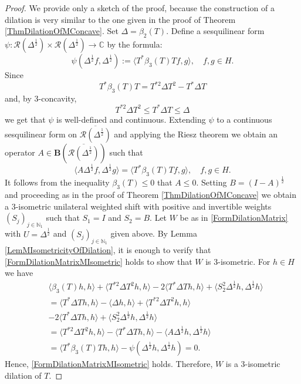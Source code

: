 \documentclass{amsart}
\renewcommand{\le}{\leqslant}
\theoremstyle{definition}
\numberwithin{equation}{section}
\begin{document}
\begin{proof}
    We provide only a sketch of the proof, because the construction of a dilation is very similar to the one given in the proof of Theorem \ref{ThmDilationOfMConcave}. Set $ \Delta = \beta_{2}(T) $. Define a sesquilinear form $ \psi\colon \mathcal{R}(\Delta^{\frac{1}{2}})\times \mathcal{R}(\Delta^{\frac{1}{2}}) \to \mathbb{C} $ by the formula:
    \begin{equation*}
        \psi(\Delta^{\frac{1}{2}}f,\Delta^{\frac{1}{2}}):= \langle T^{\ast}\beta_{3}(T)Tf,g\rangle, \quad f,g\in H.
    \end{equation*}
    Since
    \begin{equation*}
        T^{\ast}\beta_{3}(T)T = T^{\ast 2}\Delta T^{2} - T^{\ast}\Delta T
    \end{equation*}
    and, by 3-concavity,
    \begin{equation*}
        T^{\ast 2}\Delta T^{2} \le T^{\ast }\Delta T \le \Delta
    \end{equation*}
    we get that $ \psi $ is well-defined and continuous.  Extending $ \psi $ to a continuous sesquilinear form on $ \overline{\mathcal{R}(\Delta^{\frac{1}{2}})} $ and applying the Riesz theorem we obtain an operator $ A\in \mathbf{B}(\overline{\mathcal{R}(\Delta^{\frac{1}{2}})}) $ such that
    \begin{equation}
        \langle A\Delta^{\frac{1}{2}}f,\Delta^{\frac{1}{2}}g\rangle = \langle T^{\ast}\beta_{3}(T)Tf,g\rangle, \quad f,g\in H.
    \end{equation}
    It follows from the inequality $ \beta_{3}(T)\le 0 $ that $ A\le 0 $. Setting $ B = (I-A)^{\frac{1}{2}} $ and proceeding as in the proof of Theorem \ref{ThmDilationOfMConcave} we obtain a 3-isometric unilateral weighted shift with positive and invertible weights $ (S_{j})_{j\in \mathbb{N}_{1}} $ such that $ S_{1} = I $ and $ S_{2} = B $. Let $ W $ be as in \eqref{FormDilationMatrix} with $ U = \Delta^{\frac{1}{2}} $ and $ (S_{j})_{j\in \mathbb{N}_{1}} $ given above. By Lemma \ref{LemMIsometricityOfDilation}, it is enough to verify that \eqref{FormDilationMatrixMIsometric} holds to show that $ W $ is 3-isometric. For $ h\in H $ we have
    \begin{align*}
        &\langle \beta_{3}(T)h,h\rangle + \langle T^{\ast 2}\Delta T^{2}h,h\rangle -2\langle T^{\ast}\Delta Th,h\rangle + \langle S_{2}^{2}\Delta^{\frac{1}{2}}h,\Delta^{\frac{1}{2}}h\rangle\\
        &=\langle T^{\ast}\Delta Th,h\rangle - \langle \Delta h,h\rangle + \langle T^{\ast 2}\Delta T^{2}h,h\rangle\\ &-2\langle T^{\ast}\Delta Th,h\rangle + \langle S_{2}^{2}\Delta^{\frac{1}{2}}h,\Delta^{\frac{1}{2}}h\rangle\\
        &=\langle T^{\ast 2}\Delta T^{2}h,h\rangle - \langle T^{\ast}\Delta Th,h\rangle -\langle A\Delta^{\frac{1}{2}}h,\Delta^{\frac{1}{2}}h\rangle\\
        &=\langle T^{\ast}\beta_{3}(T)Th,h\rangle - \psi(\Delta^{\frac{1}{2}}h,\Delta^{\frac{1}{2}}h) = 0.
    \end{align*}
    Hence, \eqref{FormDilationMatrixMIsometric} holds. Therefore, $ W $ is a 3-isometric dilation of $ T $.
\end{proof}
\end{document}
